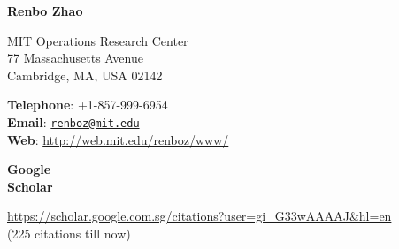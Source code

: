 \documentclass[11pt]{article}
\begin{document}
 
\begin{center}
\textbf{Renbo Zhao}\\
\end{center}

\begin{minipage}[t]{0.5\textwidth}
MIT Operations Research Center\\
77 Massachusetts Avenue\\
Cambridge, MA, USA 02142
\end{minipage}
\hspace{.5cm}
\begin{minipage}[t]{0.5\textwidth}
\textbf{Telephone}: +1-857-999-6954\\
\textbf{Email}: \href{mailto:}{\tt renboz@mit.edu}\\
\textbf{Web}: \url{http://web.mit.edu/renboz/www/}
\end{minipage} \newline\newline


\begin{minipage}[t]{0.18\textwidth}
\textbf{Google\\ Scholar}
\end{minipage}
\begin{minipage}[t]{0.8\textwidth}
\url{https://scholar.google.com.sg/citations?user=gi_G33wAAAAJ&hl=en}\\
(225 citations till now)
\end{minipage} \newline\newline
\end{document}
